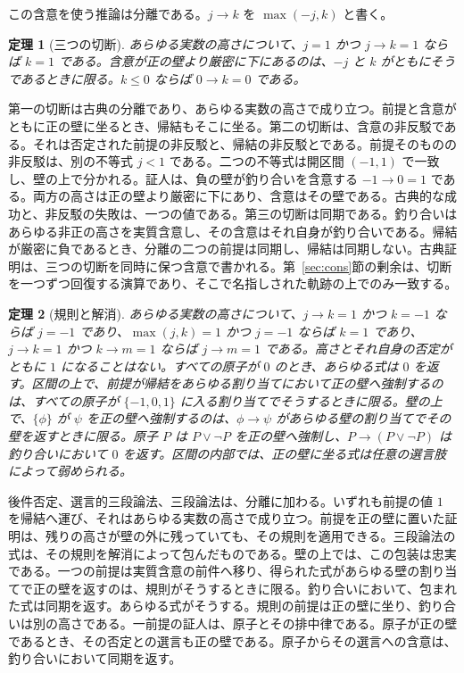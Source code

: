\documentclass[a4paper]{article}
\newtheorem{theorem}{定理}[section]
\theoremstyle{definition}
\begin{document}
この含意を使う推論は分離である。\(j\to k\) を \(\max(-j,k)\) と書く。

\begin{theorem}[三つの切断]
\label{thm:detach}
あらゆる実数の高さについて、\(j=1\) かつ \(j\to k=1\) ならば \(k=1\) である。含意が正の壁より厳密に下にあるのは、\(-j\) と \(k\) がともにそうであるときに限る。\(k\le 0\) ならば \(0\to k=0\) である。
\end{theorem}

第一の切断は古典の分離であり、あらゆる実数の高さで成り立つ。前提と含意がともに正の壁に坐るとき、帰結もそこに坐る。第二の切断は、含意の非反駁である。それは否定された前提の非反駁と、帰結の非反駁とである。前提そのものの非反駁は、別の不等式 \(j<1\) である。二つの不等式は開区間 \((-1,1)\) で一致し、壁の上で分かれる。証人は、負の壁が釣り合いを含意する \(-1\to 0=1\) である。両方の高さは正の壁より厳密に下にあり、含意はその壁である。古典的な成功と、非反駁の失敗は、一つの値である。第三の切断は同期である。釣り合いはあらゆる非正の高さを実質含意し、その含意はそれ自身が釣り合いである。帰結が厳密に負であるとき、分離の二つの前提は同期し、帰結は同期しない。古典証明は、三つの切断を同時に保つ含意で書かれる。第~\ref{sec:cons}節の剰余は、切断を一つずつ回復する演算であり、そこで名指しされた軌跡の上でのみ一致する。

\begin{theorem}[規則と解消]
\label{thm:rules}
あらゆる実数の高さについて、\(j\to k=1\) かつ \(k=-1\) ならば \(j=-1\) であり、\(\max(j,k)=1\) かつ \(j=-1\) ならば \(k=1\) であり、\(j\to k=1\) かつ \(k\to m=1\) ならば \(j\to m=1\) である。高さとそれ自身の否定がともに \(1\) になることはない。すべての原子が \(0\) のとき、あらゆる式は \(0\) を返す。区間の上で、前提が帰結をあらゆる割り当てにおいて正の壁へ強制するのは、すべての原子が \(\{-1,0,1\}\) に入る割り当てでそうするときに限る。壁の上で、\(\{\phi\}\) が \(\psi\) を正の壁へ強制するのは、\(\phi\to\psi\) があらゆる壁の割り当てでその壁を返すときに限る。原子 \(P\) は \(P\vee\neg P\) を正の壁へ強制し、\(P\to(P\vee\neg P)\) は釣り合いにおいて \(0\) を返す。区間の内部では、正の壁に坐る式は任意の選言肢によって弱められる。
\end{theorem}

後件否定、選言的三段論法、三段論法は、分離に加わる。いずれも前提の値 \(1\) を帰結へ運び、それはあらゆる実数の高さで成り立つ。前提を正の壁に置いた証明は、残りの高さが壁の外に残っていても、その規則を適用できる。三段論法の式は、その規則を解消によって包んだものである。壁の上では、この包装は忠実である。一つの前提は実質含意の前件へ移り、得られた式があらゆる壁の割り当てで正の壁を返すのは、規則がそうするときに限る。釣り合いにおいて、包まれた式は同期を返す。あらゆる式がそうする。規則の前提は正の壁に坐り、釣り合いは別の高さである。一前提の証人は、原子とその排中律である。原子が正の壁であるとき、その否定との選言も正の壁である。原子からその選言への含意は、釣り合いにおいて同期を返す。
\end{document}
